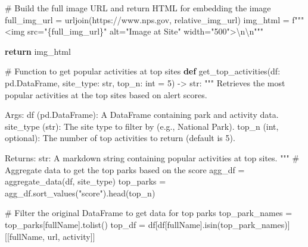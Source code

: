 \documentclass[
  letterpaper,
  DIV=11,
  numbers=noendperiod]{scrartcl}
\newenvironment{Shaded}{\begin{snugshade}}{\end{snugshade}}
\newcommand{\BuiltInTok}[1]{\textcolor[rgb]{0.00,0.23,0.31}{#1}}
\newcommand{\CharTok}[1]{\textcolor[rgb]{0.13,0.47,0.30}{#1}}
\newcommand{\CommentTok}[1]{\textcolor[rgb]{0.37,0.37,0.37}{#1}}
\newcommand{\ControlFlowTok}[1]{\textcolor[rgb]{0.00,0.23,0.31}{\textbf{#1}}}
\newcommand{\DecValTok}[1]{\textcolor[rgb]{0.68,0.00,0.00}{#1}}
\newcommand{\KeywordTok}[1]{\textcolor[rgb]{0.00,0.23,0.31}{\textbf{#1}}}
\newcommand{\NormalTok}[1]{\textcolor[rgb]{0.00,0.23,0.31}{#1}}
\newcommand{\OperatorTok}[1]{\textcolor[rgb]{0.37,0.37,0.37}{#1}}
\newcommand{\SpecialCharTok}[1]{\textcolor[rgb]{0.37,0.37,0.37}{#1}}
\newcommand{\SpecialStringTok}[1]{\textcolor[rgb]{0.13,0.47,0.30}{#1}}
\newcommand{\StringTok}[1]{\textcolor[rgb]{0.13,0.47,0.30}{#1}}
\begin{document}
\begin{Shaded}
\begin{Highlighting}[]
    \CommentTok{\# Build the full image URL and return HTML for embedding the image}
\NormalTok{    full\_img\_url }\OperatorTok{=}\NormalTok{ urljoin(}\StringTok{\textquotesingle{}https://www.nps.gov\textquotesingle{}}\NormalTok{, relative\_img\_url)}
\NormalTok{    img\_html }\OperatorTok{=} \SpecialStringTok{f"""\textless{}img src="}\SpecialCharTok{\{}\NormalTok{full\_img\_url}\SpecialCharTok{\}}\SpecialStringTok{" alt="Image at Site" width="500"\textgreater{}}\CharTok{\textbackslash{}n\textbackslash{}n}\SpecialStringTok{"""}

    \ControlFlowTok{return}\NormalTok{ img\_html}

\CommentTok{\# Function to get popular activities at top sites}
\KeywordTok{def}\NormalTok{ get\_top\_activities(df: pd.DataFrame, site\_type: }\BuiltInTok{str}\NormalTok{, top\_n: }\BuiltInTok{int} \OperatorTok{=} \DecValTok{5}\NormalTok{) }\OperatorTok{{-}\textgreater{}} \BuiltInTok{str}\NormalTok{:}
    \CommentTok{"""}
\CommentTok{    Retrieves the most popular activities at the top sites based on alert scores.}

\CommentTok{    Args:}
\CommentTok{        df (pd.DataFrame): A DataFrame containing park and activity data.}
\CommentTok{        site\_type (str): The site type to filter by (e.g., \textquotesingle{}National Park\textquotesingle{}).}
\CommentTok{        top\_n (int, optional): The number of top activities to return (default is 5).}

\CommentTok{    Returns:}
\CommentTok{        str: A markdown string containing popular activities at top sites.}
\CommentTok{    """}
    \CommentTok{\# Aggregate data to get the top parks based on the score}
\NormalTok{    agg\_df }\OperatorTok{=}\NormalTok{ aggregate\_data(df, site\_type)}
\NormalTok{    top\_parks }\OperatorTok{=}\NormalTok{ agg\_df.sort\_values(}\StringTok{"score"}\NormalTok{).head(top\_n)}

    \CommentTok{\# Filter the original DataFrame to get data for top parks}
\NormalTok{    top\_park\_names }\OperatorTok{=}\NormalTok{ top\_parks[}\StringTok{\textquotesingle{}fullName\textquotesingle{}}\NormalTok{].tolist()}
\NormalTok{    top\_df }\OperatorTok{=}\NormalTok{ df[df[}\StringTok{\textquotesingle{}fullName\textquotesingle{}}\NormalTok{].isin(top\_park\_names)][[}\StringTok{\textquotesingle{}fullName\textquotesingle{}}\NormalTok{, }\StringTok{\textquotesingle{}url\textquotesingle{}}\NormalTok{, }\StringTok{\textquotesingle{}activity\textquotesingle{}}\NormalTok{]]}


\end{Highlighting}
\end{Shaded}
\end{document}
